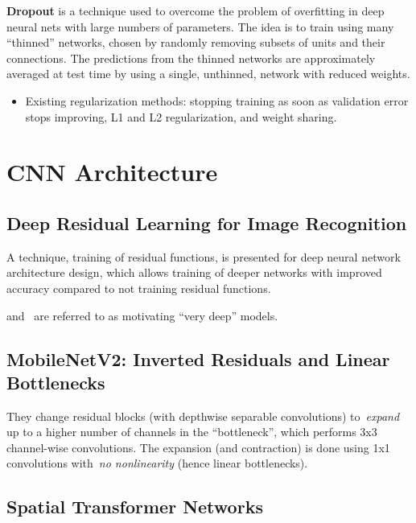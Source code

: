 \documentclass[a4paper, 12pt]{article}
\begin{document}
\textbf{Dropout} is a technique used to overcome the problem of overfitting in
deep neural nets with large numbers of parameters. The idea is to train using
many ``thinned'' networks, chosen by randomly removing subsets of units and
their connections. The predictions from the thinned networks are approximately
averaged at test time by using a single, unthinned, network with reduced
weights.

\begin{itemize}
        \item Existing regularization methods: stopping training as soon as
                validation error stops improving, L1 and L2 regularization, and
                weight sharing\citet{Nowlan:1992:SNN:148167.148169}.
\end{itemize}


\section{CNN Architecture}


\subsection{Deep Residual Learning for Image
            Recognition\citet{DBLP:journals/corr/HeZRS15}}

A technique, training of residual functions, is presented for deep neural
network architecture design, which allows training of deeper networks with
improved accuracy compared to not training residual functions.

\citet{going-deeper-szegedy43022} and~\citet{DBLP:journals/corr/SimonyanZ14a} are
referred to as motivating ``very deep'' models.



\subsection{MobileNetV2: Inverted Residuals and Linear
            Bottlenecks~\cite{Sandler_2018_CVPR}}

They change residual blocks (with depthwise separable convolutions)
to~\emph{expand} up to a higher number of channels in the ``bottleneck'', which
performs 3x3 channel-wise convolutions. The expansion (and contraction) is done
using 1x1 convolutions with~\emph{no nonlinearity} (hence linear bottlenecks).


\subsection{Spatial Transformer Networks~\citet{jaderberg-spatial-2015}}
\end{document}

